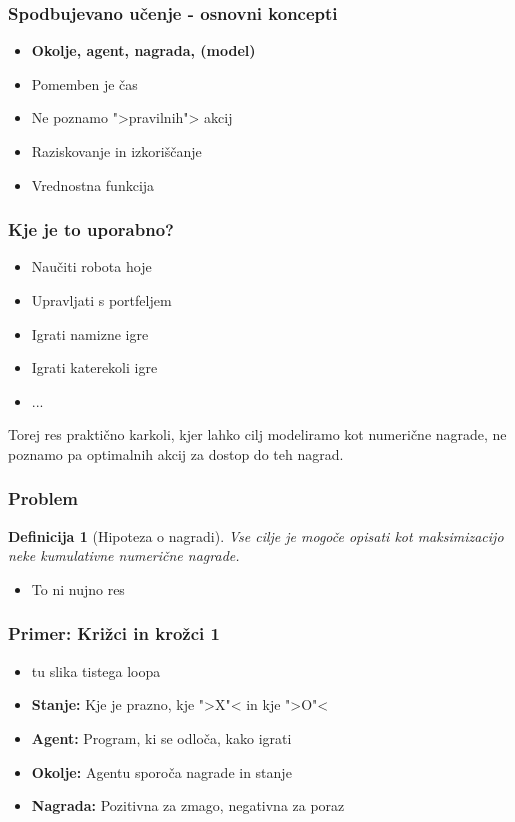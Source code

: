 \documentclass{beamer}    %
\newtheorem{definicija}[izrek]{Definicija}
\begin{document}
\begin{frame}
    \frametitle{Spodbujevano učenje - osnovni koncepti}
    \begin{itemize}
        \item \textbf{Okolje, agent, nagrada, (model)}
        \item Pomemben je čas
        \item Ne poznamo ">pravilnih"> akcij
        \item Raziskovanje in izkoriščanje
        \item Vrednostna funkcija
    \end{itemize}
\end{frame}


\begin{frame}
    \frametitle{Kje je to uporabno?}
    \begin{itemize}
        \item Naučiti robota hoje
        \item Upravljati s portfeljem
        \item Igrati namizne igre
        \item Igrati katerekoli igre
        \item ...
    \end{itemize}
    Torej res praktično karkoli, kjer lahko cilj modeliramo kot numerične
    nagrade, ne poznamo pa optimalnih akcij za dostop do teh nagrad.
\end{frame}


\begin{frame}
    \frametitle{Problem}
    \begin{definicija}[Hipoteza o nagradi]
        Vse cilje je mogoče opisati kot maksimizacijo neke kumulativne numerične 
        nagrade.
    \end{definicija}

    \medskip

    \begin{itemize}
        \item To ni nujno res
    \end{itemize}
\end{frame}


\begin{frame}
    \frametitle{Primer: Križci in krožci 1}
    \begin{itemize}
        \item tu slika tistega loopa %
        \item \textbf{Stanje:} Kje je prazno, kje ">X"< in kje ">O"<
        \item \textbf{Agent:} Program, ki se odloča, kako igrati
        \item \textbf{Okolje:} Agentu sporoča nagrade in stanje
        \item \textbf{Nagrada:} Pozitivna za zmago, negativna za poraz
    \end{itemize}
\end{frame}
\end{document}
